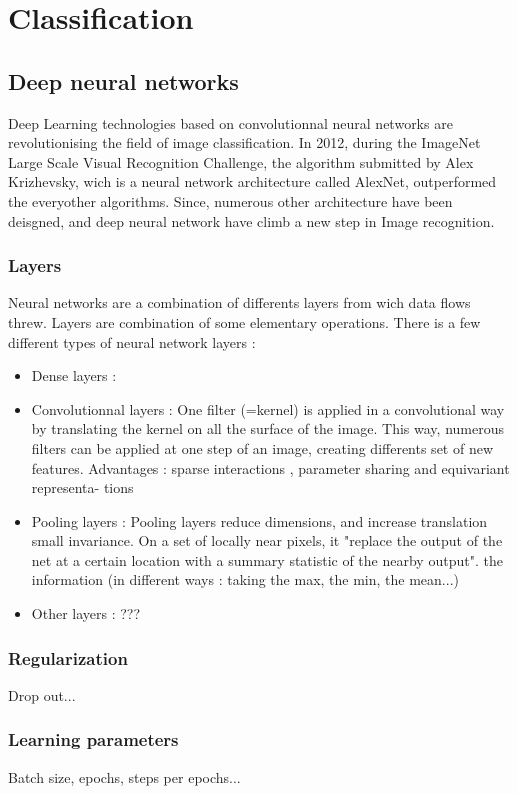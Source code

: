 \newpage

\section{Classification}
\subsection{Deep neural networks}
	Deep Learning technologies based on convolutionnal neural networks are revolutionising the field of image classification. In 2012, during the ImageNet Large Scale Visual Recognition Challenge, the algorithm submitted by Alex Krizhevsky, wich is a neural network architecture called AlexNet, outperformed the everyother algorithms. Since, numerous other architecture have been deisgned, and deep neural network have climb a new step in Image recognition.
\subsubsection{Layers}
	Neural networks are a combination of differents layers from wich data flows threw. Layers are combination of some elementary operations. There is a few different types of neural network layers :
	\begin{itemize}
		\item Dense layers : 
		\item Convolutionnal layers : One filter (=kernel) is applied in a convolutional way by translating the kernel on all the surface of the image. This way, numerous filters can be applied at one step of an image, creating differents set of new features. Advantages : sparse interactions , parameter sharing and equivariant representa-
		tions
		\item Pooling layers : Pooling layers reduce dimensions, and increase translation small invariance. On a set of locally near pixels, it "replace the output of the net at a certain location with a summary statistic of the nearby output". the information (in different ways : taking the max, the min, the mean...)
		\item Other layers : ???
	\end{itemize}
\subsubsection{Regularization}
	Drop out...
\subsubsection{Learning parameters}
	Batch size, epochs, steps per epochs... 
